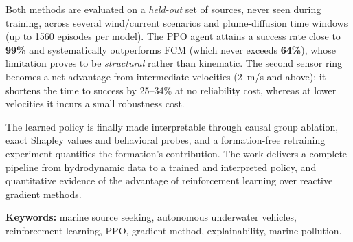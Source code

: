 \documentclass[12pt,a4paper]{article}
\begin{document}
Both methods are evaluated on a \emph{held-out} set of sources, never seen during training,
across several wind/current scenarios and plume-diffusion time windows (up to 1560 episodes
per model). The PPO agent attains a success rate close to \textbf{99\%} and systematically
outperforms FCM (which never exceeds \textbf{64\%}), whose limitation proves to be
\emph{structural} rather than kinematic. The second sensor ring becomes a net advantage from
intermediate velocities (2~m/s and above): it shortens the time to success by 25--34\% at no
reliability cost, whereas at lower velocities it incurs a small robustness cost.

The learned policy is finally
made interpretable through causal group ablation, exact Shapley values and behavioral
probes, and a formation-free retraining experiment quantifies the formation's contribution.
The work delivers a complete pipeline from hydrodynamic data to a trained and interpreted
policy, and quantitative evidence of the advantage of reinforcement learning over reactive
gradient methods.

\medskip
\noindent\textbf{Keywords:} marine source seeking, autonomous underwater vehicles,
reinforcement learning, PPO, gradient method, explainability, marine pollution.
\end{document}
